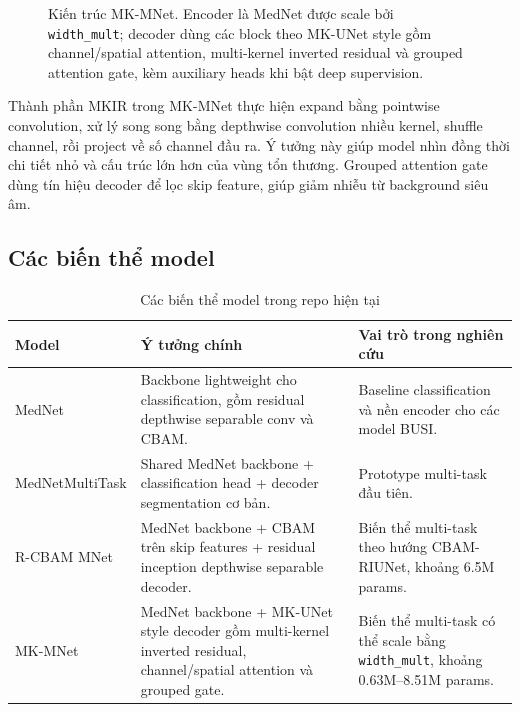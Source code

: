 \documentclass[12pt,a4paper]{article}
\begin{document}
\begin{figure}[H]
{
}
\caption{Kiến trúc MK-MNet. Encoder là MedNet được scale bởi \texttt{width\_mult}; decoder dùng các block theo MK-UNet style gồm channel/spatial attention, multi-kernel inverted residual và grouped attention gate, kèm auxiliary heads khi bật deep supervision.}
\end{figure}

Thành phần MKIR trong MK-MNet thực hiện expand bằng pointwise convolution, xử lý song song bằng depthwise convolution nhiều kernel, shuffle channel, rồi project về số channel đầu ra. Ý tưởng này giúp model nhìn đồng thời chi tiết nhỏ và cấu trúc lớn hơn của vùng tổn thương. Grouped attention gate dùng tín hiệu decoder để lọc skip feature, giúp giảm nhiễu từ background siêu âm.

\subsection{Các biến thể model}

\begin{table}[H]
\centering
\caption{Các biến thể model trong repo hiện tại}
\renewcommand{\arraystretch}{1.25}
\begin{tabular}{p{3.2cm} p{5.5cm} p{5.8cm}}
\toprule
\textbf{Model} & \textbf{Ý tưởng chính} & \textbf{Vai trò trong nghiên cứu} \\
\midrule
MedNet & Backbone lightweight cho classification, gồm residual depthwise separable conv và CBAM. & Baseline classification và nền encoder cho các model BUSI. \\
MedNetMultiTask & Shared MedNet backbone + classification head + decoder segmentation cơ bản. & Prototype multi-task đầu tiên. \\
R-CBAM MNet & MedNet backbone + CBAM trên skip features + residual inception depthwise separable decoder. & Biến thể multi-task theo hướng CBAM-RIUNet, khoảng 6.5M params. \\
MK-MNet & MedNet backbone + MK-UNet style decoder gồm multi-kernel inverted residual, channel/spatial attention và grouped gate. & Biến thể multi-task có thể scale bằng \texttt{width\_mult}, khoảng 0.63M--8.51M params. \\
\bottomrule
\end{tabular}
\end{table}
\end{document}
